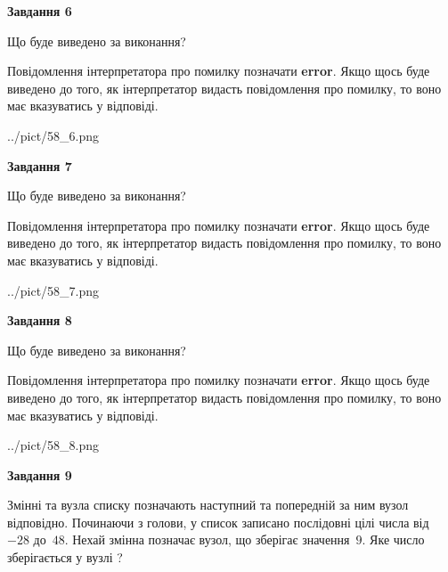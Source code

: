 \documentclass[12pt, ukrainian]{article}
\begin{document}
{\begin {large}
{\begin {center}\textbf{Завдання 6}\end {center}}\par
Що буде виведено за виконання?

Повідомлення інтерпретатора про помилку позначати \textbf{error}.
Якщо щось буде виведено до того, як інтерпретатор видасть повідомлення про помилку, 
то воно має вказуватись у відповіді. \par


\begin{center}
	{../pict/58_6.png}
\end{center}
\newpage

{\begin {center}\textbf{Завдання 7}\end {center}}\par
Що буде виведено за виконання?

Повідомлення інтерпретатора про помилку позначати \textbf{error}.
Якщо щось буде виведено до того, як інтерпретатор видасть повідомлення про помилку, 
то воно має вказуватись у відповіді. \par


\begin{center}
	{../pict/58_7.png}
\end{center}
\newpage

{\begin {center}\textbf{Завдання 8}\end {center}}\par
Що буде виведено за виконання?

Повідомлення інтерпретатора про помилку позначати \textbf{error}.
Якщо щось буде виведено до того, як інтерпретатор видасть повідомлення про помилку, 
то воно має вказуватись у відповіді. \par


\begin{center}
	{../pict/58_8.png}
\end{center}
\newpage

{\begin {center}\textbf{Завдання 9}\end {center}}\par
Змінні  та  вузла списку позначають наступний та попередній за ним вузол відповідно. Починаючи з голови, у список записано послідовні цілі числа від~$-28$ до~$48$. Нехай змінна  позначає вузол, що зберігає значення~$9$.
Яке число зберігається у вузлі  ?\par
\newpage


\end{large}}
\end{document}

